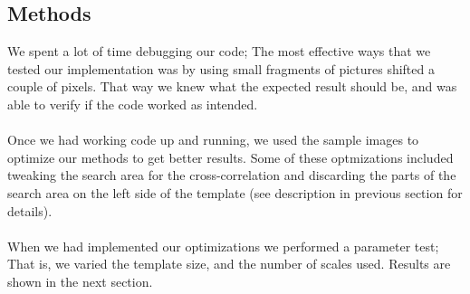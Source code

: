 \documentclass[12pt,a4paper,oneside,final]{article}
\begin{document}
\subsection{Methods}
We spent a lot of time debugging our code; The most effective ways that we tested our implementation was by using small fragments of pictures shifted a couple of pixels. That way we knew what the expected result should be, and was able to verify if the code worked as intended.\\\\
Once we had working code up and running, we used the sample images to optimize our methods to get better results. Some of these optmizations included tweaking the search area for the cross-correlation and discarding the parts of the search area on the left side of the template (see description in previous section for details).\\\\
When we had implemented our optimizations we performed a parameter test; That is, we varied the template size, and the number of scales used. Results are shown in the next section.
\end{document}
